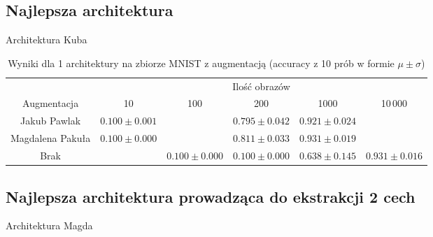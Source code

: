 \documentclass[10pt]{article}
\begin{document}
\subsection*{Najlepsza architektura}

Architektura Kuba

\begin{table}[H]\centering
    \begin{tabular}{cccccc}
        \toprule
                         & \multicolumn{5}{c}{Ilość obrazów}                                                                                  \\ \cmidrule{2-6}
        Augmentacja      & 10                                & 100               & 200                & 1000              & 10\,000           \\ \midrule
        Jakub Pawlak     & $0.100 \pm 0.001 $                &                   & $0.795 \pm 0.042 $ & $0.921 \pm 0.024$                     \\
        Magdalena Pakuła & $0.100 \pm 0.000 $                &                   & $0.811 \pm 0.033 $ & $0.931 \pm 0.019$                     \\
        Brak             &                                   & $0.100 \pm 0.000$ & $0.100 \pm 0.000$  & $0.638 \pm 0.145$ & $0.931 \pm 0.016$ \\
        \bottomrule
    \end{tabular}
    \caption{Wyniki dla 1 architektury na zbiorze MNIST z augmentacją (accuracy z 10 prób w formie $\mu \pm \sigma$)}
\end{table}

\subsection*{Najlepsza architektura prowadząca do ekstrakcji 2 cech}

Architektura Magda
\end{document}
